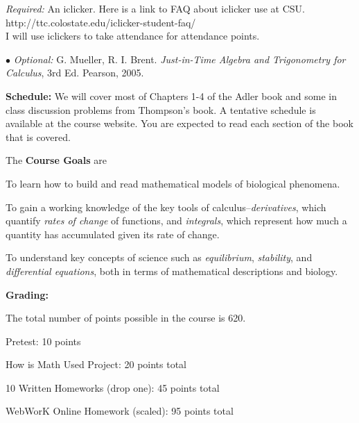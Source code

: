 \documentclass[11pt]{article}
\begin{document}
\noindent \textit{Required:} An iclicker. Here is a link to FAQ about iclicker use at CSU.\\
 http://ttc.colostate.edu/iclicker-student-faq/ \\
I will use iclickers to take attendance for attendance points.

\vspace{2mm}

\noindent $\bullet$ \textit{Optional:} G. Mueller, R. I. Brent.  \textit{Just-in-Time Algebra and Trigonometry for Calculus}, 3rd Ed.  Pearson, 2005.

\vspace{2mm}



\noindent \textbf{Schedule:} We will cover most of Chapters 1-4 of the Adler book and some in class discussion problems from Thompson's book.   A tentative schedule is available at the course website.  You are expected to read each section of the book that is covered.

\vspace{2mm}

\noindent The \textbf{Course Goals} are

To learn how to build and read mathematical models of biological phenomena.

To gain a working knowledge of the key tools of calculus--\textit{derivatives}, which quantify \textit{rates of change} of functions, and \textit{integrals}, which represent how much a quantity has accumulated given its rate of change.

To understand key concepts of science such as \textit{equilibrium}, \textit{stability}, and \textit{differential equations}, both in terms of mathematical descriptions and biology.

\vspace{1cm}

\noindent \textbf{Grading:}

\vspace{2 mm}

\vspace{1mm} 

The total number of points possible in the course is 620. 

Pretest: 10 points

How is Math Used Project: 20 points total

10 Written Homeworks (drop one):  45 points total

WebWorK Online Homework (scaled):  95 points total 
\end{document}
